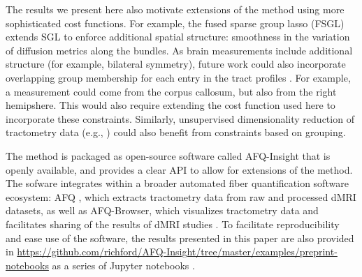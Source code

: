 The results we present here also motivate extensions of the method using more
sophisticated cost functions. For example, the fused sparse group lasso (FSGL)
\cite{zhou2012} extends SGL to enforce additional spatial structure: smoothness
in the variation of diffusion metrics along the bundles. As brain measurements
include additional structure (for example, bilateral symmetry), future work
could also incorporate overlapping group membership for each entry in the tract
profiles \cite{Rao2014-xm}. For example, a measurement could come from the
corpus callosum, but also from the right hemipshere. This would also require
extending the cost function used here to incorporate these constraints.
Similarly, unsupervised dimensionality reduction of tractometry data (e.g.,
\cite{Chamberland2019-mu}) could also benefit from constraints based on
grouping.

The method is packaged as open-source software called AFQ-Insight
that is openly available, and provides a clear API to allow
for extensions of the method. The sofware integrates within a
broader automated fiber quantification software ecosystem: AFQ
\cite{yeatman2012tract}, which extracts tractometry data from raw and
processed dMRI datasets, as well as AFQ-Browser, which visualizes
tractometry data and facilitates sharing of the results of dMRI studies
\cite{yeatman2018browser}. To facilitate reproducibility and ease use
of the software, the results presented
in this paper are also provided in
\url{https://github.com/richford/AFQ-Insight/tree/master/examples/preprint-notebooks} as a series of Jupyter notebooks
\cite{kluyver2016jupyter}.

